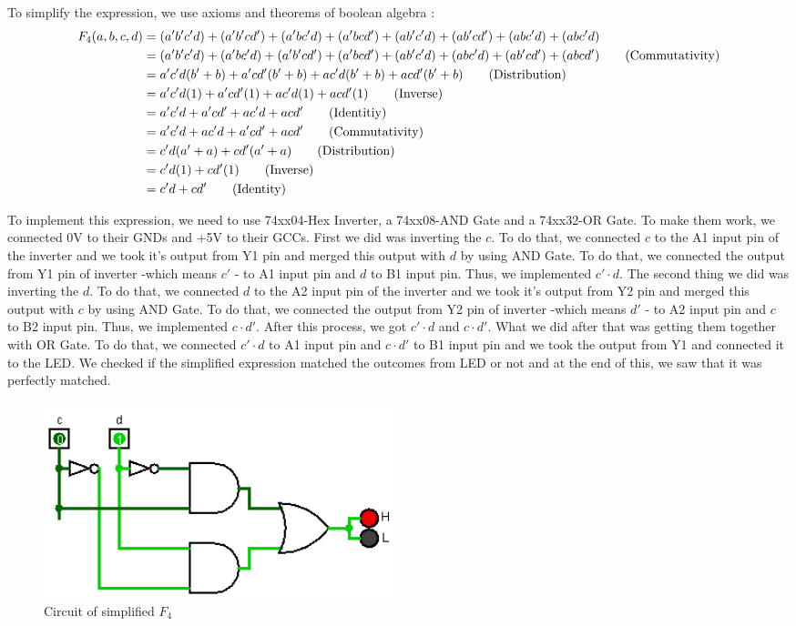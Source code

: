 \documentclass[pdftex,12pt,a4paper]{article}
\begin{document}
To simplify the expression, we use axioms and theorems of boolean algebra :
\begin{align}
F_{4}(a,b,c,d) &= (a'b'c'd) + (a'b'cd') + (a'bc'd) + (a'bcd') + (ab'c'd) + (ab'cd') + (abc'd) + (abc'd) \notag\\ 
&= (a'b'c'd) + (a'bc'd) + (a'b'cd') + (a'bcd') + (ab'c'd) + (abc'd) + (ab'cd') + (abcd') \tag{Commutativity}\\
&= a'c'd(b' + b) + a'cd'(b'+b) + ac'd(b' + b) + acd'(b'+b) \tag{Distribution} \\
&= a'c'd(1) + a'cd'(1) + ac'd(1) + acd'(1) \tag{Inverse} \\
&= a'c'd + a'cd'+ ac'd+ acd' \tag{Identitiy} \\
&= a'c'd + ac'd + a'cd' + acd' \tag{Commutativity} \\
&= c'd(a' + a) + cd'(a' + a) \tag{Distribution} \\
&= c'd(1) + cd'(1) \tag{Inverse} \\
&= c'd + cd' \tag{Identity}
\end{align}

To implement this expression, we need to use 74xx04-Hex Inverter, a 74xx08-AND Gate and a 74xx32-OR Gate. To make them work, we connected 0V to their GNDs and +5V to their GCCs. First we did was inverting the $c$. To do that, we connected $c$ to the A1 input pin of the inverter and we took it's output from Y1 pin and merged this output with $d$ by using AND Gate. To do that, we connected the output from Y1 pin of inverter -which means $c'$ - to A1 input pin and $d$ to B1 input pin. Thus, we implemented $c' \cdot d$. The second thing we did was inverting the $d$. To do that, we connected $d$ to the A2 input pin of the inverter and we took it's output from Y2 pin and merged this output with $c$ by using AND Gate. To do that, we connected the output from Y2 pin of inverter -which means $d'$ - to A2 input pin and $c$ to B2 input pin. Thus, we implemented $c \cdot d'$. After this process, we got $c' \cdot d$ and $c \cdot d'$. What we did after that was getting them together with OR Gate. To do that, we connected $c' \cdot d$ to A1 input pin and $c \cdot d'$ to B1 input pin and we took the output from Y1 and connected it to the LED. We checked if the simplified expression matched the outcomes from LED or not and at the end of this, we saw that it was perfectly matched.

\begin{figure}[ht]
	\centering
	\includegraphics[width=0.5\textwidth]{2_4.png}	
	\caption{Circuit of simplified $F_4$}
	\label{fig1}
\end{figure}
\end{document}

